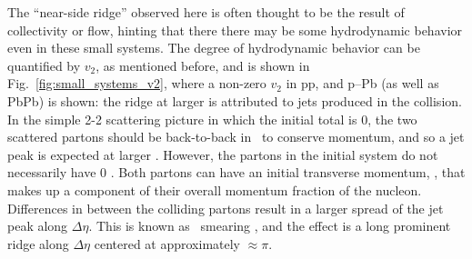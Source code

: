  The ``near-side ridge'' observed here is often thought to be the result of collectivity or flow, hinting that there there may be some hydrodynamic behavior even in these small systems. The degree of hydrodynamic behavior can be quantified by $v_2$, as mentioned before, and is shown in Fig.~\ref{fig:small_systems_v2}, where a non-zero  $v_2$ in pp, and p--Pb (as well as PbPb) is shown: the ridge at larger \deltaphi is attributed to jets produced in the collision. In the simple 2-2 scattering picture in which the initial total \pt is 0, the two scattered partons should be back-to-back in \deltaphi~to conserve momentum, and so a jet peak is expected at larger \deltaphi. However, the partons in the initial system  do not necessarily have 0 \pt. Both partons can have an initial transverse momentum, \kt, that makes up a component of their overall momentum fraction of the nucleon. Differences in \kt between the colliding partons result in a larger spread of the jet peak along $\Delta\eta$. This is known as \kt~smearing \cite{PHENIXCollaboration2006}, and the effect is a long prominent ridge along  $\Delta\eta$ centered at approximately \deltaphi$\approx \pi$.
